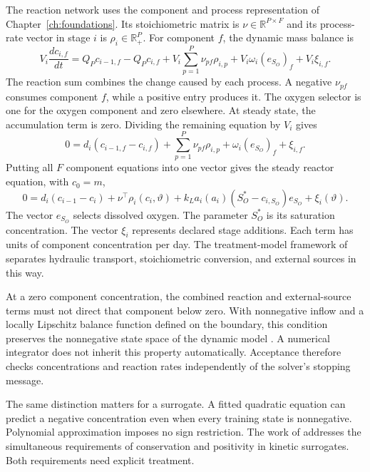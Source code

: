 The reaction network uses the component and process representation of Chapter~\ref{ch:foundations}. Its stoichiometric matrix is $\nu\in\mathbb R^{P\times F}$ and its process-rate vector in stage $i$ is $\rho_i\in\mathbb R_+^P$. For component $f$, the dynamic mass balance is
\begin{equation}
V_i\frac{dc_{i,f}}{dt}=Q_Pc_{i-1,f}-Q_Pc_{i,f}
+V_i\sum_{p=1}^{P}\nu_{pf}\rho_{i,p}+V_i\omega_i(e_{S_O})_f+V_i\xi_{i,f}.
\end{equation}
The reaction sum combines the change caused by each process. A negative $\nu_{pf}$ consumes component $f$, while a positive entry produces it. The oxygen selector is one for the oxygen component and zero elsewhere. At steady state, the accumulation term is zero. Dividing the remaining equation by $V_i$ gives
\begin{equation}
0=d_i(c_{i-1,f}-c_{i,f})+\sum_{p=1}^{P}\nu_{pf}\rho_{i,p}
+\omega_i(e_{S_O})_f+\xi_{i,f}.
\end{equation}
Putting all $F$ component equations into one vector gives the steady reactor equation, with $c_0=m$,
\begin{equation}
0=d_i(c_{i-1}-c_i)+\nu^\top\rho_i(c_i,\vartheta)
+k_La_i(a_i)(S_O^*-c_{i,S_O})e_{S_O}+\xi_i(\vartheta).
\label{eq:plant_reactor}
\end{equation}
The vector $e_{S_O}$ selects dissolved oxygen. The parameter $S_O^*$ is its saturation concentration. The vector $\xi_i$ represents declared stage additions. Each term has units of component concentration per day. The treatment-model framework of \citet{Henze2006} separates hydraulic transport, stoichiometric conversion, and external sources in this way.

At a zero component concentration, the combined reaction and external-source terms must not direct that component below zero. With nonnegative inflow and a locally Lipschitz balance function defined on the boundary, this condition preserves the nonnegative state space of the dynamic model \citep{Haddad2010}. A numerical integrator does not inherit this property automatically. Acceptance therefore checks concentrations and reaction rates independently of the solver's stopping message.

The same distinction matters for a surrogate. A fitted quadratic equation can predict a negative concentration even when every training state is nonnegative. Polynomial approximation imposes no sign restriction. The work of \citet{KircherVotsmeier2025} addresses the simultaneous requirements of conservation and positivity in kinetic surrogates. Both requirements need explicit treatment.

